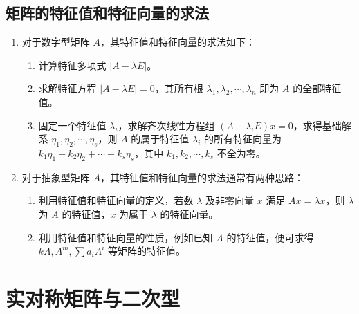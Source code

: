 \documentclass[UTF8]{ctexart}
\theoremstyle{mydef}
\begin{document}
\subsection{矩阵的特征值和特征向量的求法}
\begin{enumerate}
    \item 对于数字型矩阵 $A$，其特征值和特征向量的求法如下：
    \begin{enumerate}
        \item 计算特征多项式 $|A - \lambda E|$。
        \item 求解特征方程 $|A - \lambda E| = 0$，其所有根 $\lambda_1, \lambda_2, \cdots, \lambda_n$ 即为 $A$ 的全部特征值。
        \item 固定一个特征值 $\lambda_i$，求解齐次线性方程组 $(A - \lambda_i E)x = 0$，求得基础解系 $\eta_1, \eta_2, \cdots, \eta_s$，则 $A$ 的属于特征值 $\lambda_i$ 的所有特征向量为 $k_1 \eta_1 + k_2 \eta_2 + \cdots + k_s \eta_s$，其中 $k_1, k_2, \cdots, k_s$ 不全为零。
    \end{enumerate}
    \item 对于抽象型矩阵 $A$，其特征值和特征向量的求法通常有两种思路：
    \begin{enumerate}
        \item 利用特征值和特征向量的定义，若数 $\lambda$ 及非零向量 $x$ 满足 $Ax=\lambda x$，则 $\lambda$ 为 $A$ 的特征值，$x$ 为属于 $\lambda$ 的特征向量。
        \item 利用特征值和特征向量的性质，例如已知 $A$ 的特征值，便可求得 $kA, A^m, \sum a_i A^i$ 等矩阵的特征值。
    \end{enumerate}
\end{enumerate}

\newpage
\section{实对称矩阵与二次型}
\end{document}
